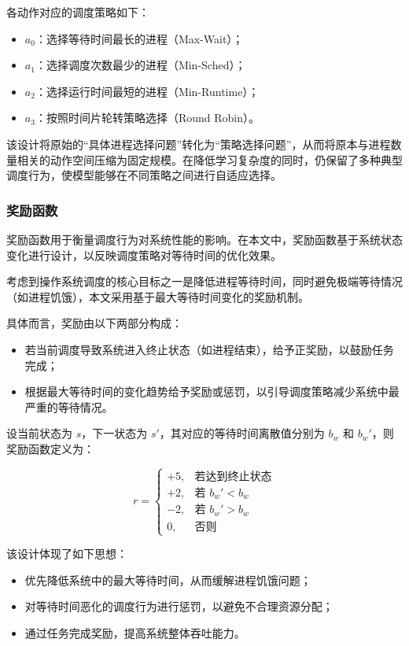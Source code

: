 各动作对应的调度策略如下：

\begin{itemize}
\item $a_0$：选择等待时间最长的进程（Max-Wait）；
\item $a_1$：选择调度次数最少的进程（Min-Sched）；
\item $a_2$：选择运行时间最短的进程（Min-Runtime）；
\item $a_3$：按照时间片轮转策略选择（Round Robin）。
\end{itemize}

该设计将原始的“具体进程选择问题”转化为“策略选择问题”，从而将原本与进程数量相关的动作空间压缩为固定规模。在降低学习复杂度的同时，仍保留了多种典型调度行为，使模型能够在不同策略之间进行自适应选择。

\subsubsection{奖励函数}

奖励函数用于衡量调度行为对系统性能的影响。在本文中，奖励函数基于系统状态变化进行设计，以反映调度策略对等待时间的优化效果。

考虑到操作系统调度的核心目标之一是降低进程等待时间，同时避免极端等待情况（如进程饥饿），本文采用基于最大等待时间变化的奖励机制。

具体而言，奖励由以下两部分构成：

\begin{itemize}
\item 若当前调度导致系统进入终止状态（如进程结束），给予正奖励，以鼓励任务完成；
\item 根据最大等待时间的变化趋势给予奖励或惩罚，以引导调度策略减少系统中最严重的等待情况。
\end{itemize}

设当前状态为 $s$，下一状态为 $s'$，其对应的等待时间离散值分别为 $b_w$ 和 $b_w'$，则奖励函数定义为：

\begin{equation}
r =
\begin{cases}
+5, & \text{若达到终止状态} \\
+2, & \text{若 } b_w' < b_w \\
-2, & \text{若 } b_w' > b_w \\
0,  & \text{否则}
\end{cases}
\end{equation}

该设计体现了如下思想：

\begin{itemize}
\item 优先降低系统中的最大等待时间，从而缓解进程饥饿问题；
\item 对等待时间恶化的调度行为进行惩罚，以避免不合理资源分配；
\item 通过任务完成奖励，提高系统整体吞吐能力。
\end{itemize}

